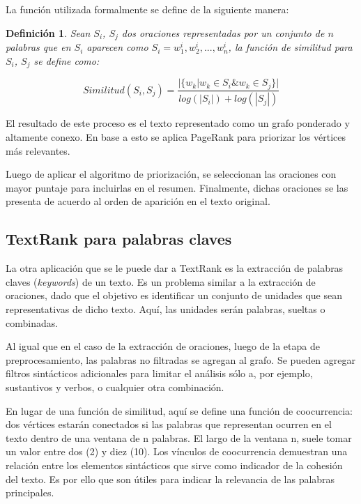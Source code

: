 \documentclass[a4paper]{article}
\newtheorem{definicion}{Definición}
\begin{document}
La función utilizada formalmente se define de la siguiente manera:

\begin{definicion}
Sean $S_i$, $S_j$ dos oraciones representadas por un conjunto de $n$ palabras que en 
$S_i$ aparecen como $S_i = w_{1}^{i}, w_{2}^{i},..., w_{n}^{i}$, la función de similitud para $S_i$, $S_j$ se define como:

\begin{equation}
Similitud(S_{i},S_{j}) = \frac{ | \{   w_{k} | w_{k} \in S_{i} \& w_{k} \in S_{j}   \}  | }    
                              {  log(|S_{i}|) + log(|S_{j}|)  }
\end{equation}
\end{definicion}
    
El resultado de este proceso es el texto representado como un grafo ponderado y altamente conexo. En base a esto se aplica PageRank para priorizar los vértices más relevantes.

Luego de aplicar el algoritmo de priorización, se seleccionan las oraciones con mayor puntaje para incluirlas en el resumen. Finalmente, dichas oraciones se las presenta de acuerdo al orden de aparición en el texto original.


\subsection{TextRank para palabras claves}
La otra aplicación que se le puede dar a TextRank es la extracción de palabras claves (\textit{keywords}) de un texto. Es un problema similar a la extracción de oraciones, dado que el objetivo es identificar un conjunto de unidades que sean representativas de dicho texto. Aquí, las unidades serán palabras, sueltas o combinadas.

Al igual que en el caso de la extracción de oraciones, luego de la etapa de preprocesamiento, las palabras no filtradas se agregan al grafo. Se pueden agregar filtros sintácticos adicionales para limitar el análisis sólo a, por ejemplo, sustantivos y verbos, o cualquier otra combinación. 

En lugar de una función de similitud, aquí se define una función de coocurrencia: dos vértices estarán conectados si las palabras que representan ocurren en el texto dentro de una ventana de n palabras. El largo de la ventana n, suele tomar un valor entre dos (2) y diez (10). Los vínculos de coocurrencia demuestran una relación entre los elementos sintácticos que sirve como indicador de la cohesión del texto. Es por ello que son útiles para indicar la relevancia de las palabras principales.
\end{document}
